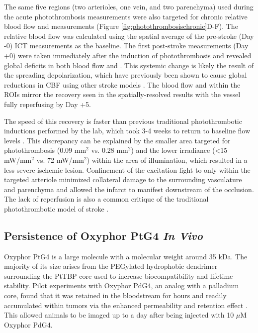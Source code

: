 The same five regions (two arterioles, one vein, and two parenchyma) used during the acute photothrombosis measurements were also targeted for chronic relative blood flow and  measurements (Figure \ref{fig:photothrombosischronic}D-F). The relative blood flow was calculated using the spatial average of the pre-stroke (Day -0) ICT measurements as the baseline. The first post-stroke measurements (Day +0) were taken immediately after the induction of photothrombosis and revealed global deficits in both blood flow and . This systemic change is likely the result of the spreading depolarization, which have previously been shown to cause global reductions in CBF using other stroke models \cite{Shin:2006dc, Nakamura:2010wp}. The blood flow and  within the ROIs mirror the recovery seen in the spatially-resolved results with the vessel fully reperfusing by Day +5.

The speed of this recovery is faster than previous traditional photothrombotic inductions performed by the lab, which took 3-4 weeks to return to baseline flow levels \cite{Schrandt:2015gu}. This discrepancy can be explained by the smaller area targeted for photothrombosis (0.09 mm$^2$ vs. 0.28 mm$^2$) and the lower irradiance (\textless15 mW/mm$^2$ vs. 72 mW/mm$^2$) within the area of illumination, which resulted in a less severe ischemic lesion. Confinement of the excitation light to only within the targeted arteriole minimized collateral damage to the surrounding vasculature and parenchyma and allowed the infarct to manifest downstream of the occlusion. The lack of reperfusion is also a common critique of the traditional photothrombotic model of stroke \cite{Carmichael:2005gk}.

\subsection{Persistence of Oxyphor PtG4 \textit{In Vivo}}

Oxyphor PtG4 is a large molecule with a molecular weight around 35 kDa. The majority of its size arises from the PEGylated hydrophobic dendrimer surrounding the PtTBP core used to increase biocompatibility and lifetime stability. Pilot experiments with Oxyphor PdG4, an analog with a palladium core, found that it was retained in the bloodstream for hours and readily accumulated within tumors via the enhanced permeability and retention effect \cite{Esipova:2011hi}. This allowed animals to be imaged up to a day after being injected with 10 $\mu$M Oxyphor PdG4.

